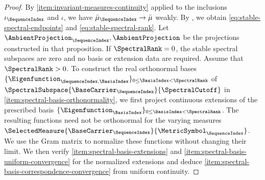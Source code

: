 \begin{proof}
By \ref{item:invariant-measures-continuity} applied to the inclusions
$\iota_\SequenceIndex$
and
$\iota$,
we have
$\bar\mu_\SequenceIndex\to\bar\mu$
weakly.
By ,
we obtain \eqref{eq:stable-spectral-endpoints}
and \eqref{eq:stable-spectral-rank}.
Let
$\AmbientProjection_\SequenceIndex,\AmbientProjection$
be the projections constructed in that proposition.
If
$\SpectralRank=0$,
the stable spectral subspaces are zero and no basis or extension data are required.
Assume that
$\SpectralRank>0$.
To construct the real orthonormal bases
$\{\Eigenfunction_{\SequenceIndex,\BasisIndex}\}_{0\leq\BasisIndex<\SpectralRank}$
of
$\SpectralSubspace{\BaseCarrier_\SequenceIndex}{\SpectralCutoff}$
in \ref{item:spectral-basis-orthonormality},
we first project continuous extensions of the prescribed basis
$\{\Eigenfunction_\BasisIndex\}_{0\leq\BasisIndex<\SpectralRank}$.
The resulting functions need not be orthonormal for the varying measures
$\SelectedMeasure{\BaseCarrier_\SequenceIndex}{\MetricSymbol_\SequenceIndex}$.
We use the Gram matrix to normalize these functions without changing their limit.
We then verify \ref{item:spectral-basis-extensions}
and \ref{item:spectral-basis-uniform-convergence}
for the normalized extensions and deduce
\ref{item:spectral-basis-correspondence-convergence}
from uniform continuity.


\end{proof}
